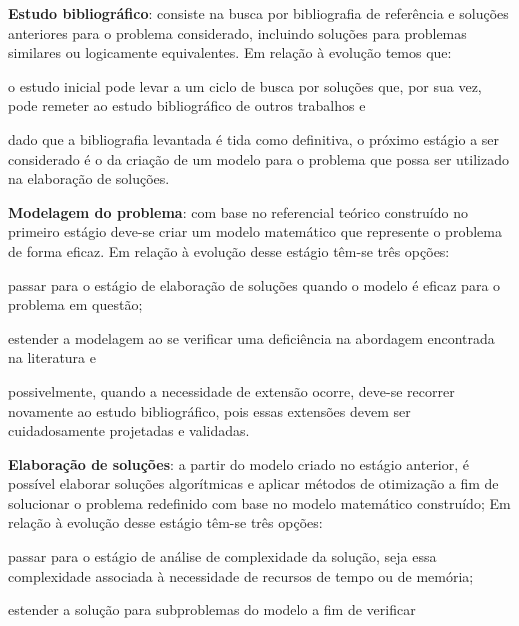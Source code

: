 \begin{compactenum}
\item {\bf Estudo bibliográfico}: consiste na busca por bibliografia de
    referência e soluções anteriores para o problema considerado, incluindo
    soluções para problemas similares ou logicamente equivalentes.
    Em relação à evolução temos que:
    \begin{compactenum}[(i)]
    \item o estudo inicial pode levar a um ciclo de busca por soluções que, por
        sua vez, pode remeter ao estudo bibliográfico de outros trabalhos e
    \item dado que a bibliografia levantada é tida como definitiva, o próximo
        estágio a ser considerado é o da criação de um modelo para o problema
        que possa ser utilizado na elaboração de soluções.
    \end{compactenum}
\item {\bf Modelagem do problema}: com base no referencial teórico construído
    no primeiro estágio deve-se criar um modelo matemático que represente o
    problema de forma eficaz.
    Em relação à evolução desse estágio têm-se três opções:
    \begin{compactenum}[(i)]
    \item passar para o estágio de elaboração de soluções quando o modelo é
        eficaz para o problema em questão;
    \item estender a modelagem ao se verificar uma deficiência na abordagem
        encontrada na literatura e
    \item possivelmente, quando a necessidade de extensão ocorre, deve-se
        recorrer novamente ao estudo bibliográfico, pois essas extensões devem
        ser cuidadosamente projetadas e validadas.
    \end{compactenum}
\item {\bf Elaboração de soluções}: a partir do modelo criado no estágio
    anterior, é possível elaborar soluções algorítmicas e aplicar métodos de
    otimização a fim de solucionar o problema redefinido com base no modelo
    matemático construído;
    Em relação à evolução desse estágio têm-se três opções:
    \begin{compactenum}[(i)]
    \item passar para o estágio de análise de complexidade da solução, seja
        essa complexidade associada à necessidade de recursos de tempo ou de
        memória;
    \item estender a solução para subproblemas do modelo a fim de verificar

\end{compactenum}
\end{compactenum}
